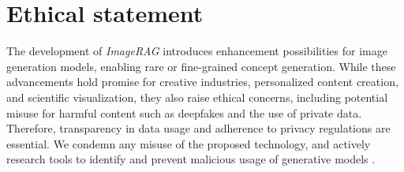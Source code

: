 \section*{Ethical statement}
The development of \emph{ImageRAG} introduces enhancement possibilities for image generation models, enabling rare or fine-grained concept generation. While these advancements hold promise for creative industries, personalized content creation, and scientific visualization, they also raise ethical concerns, including potential misuse for harmful content such as deepfakes and the use of private data.  
Therefore, transparency in data usage and adherence to privacy regulations are essential.
We condemn any misuse of the proposed technology, and actively research tools to identify and prevent malicious usage of generative models \citep{agarwal2020detecting,knafo2022fakeout,sinitsa2024deep}.